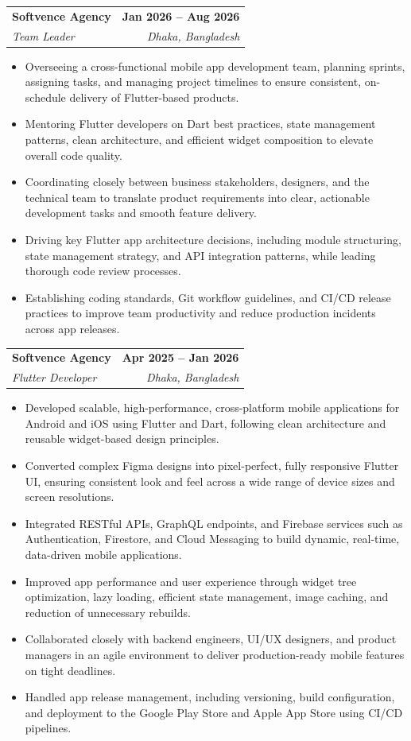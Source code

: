 \documentclass[letterpaper,11pt]{article}
\makeatletter
\newcommand{\resumeItem}[1]{\item\small{{#1 \vspace{-2pt}}}}
\newcommand{\resumeSubheading}[4]{
  \vspace{-2pt}\item
  \begin{tabular*}{1.0\textwidth}[t]{l@{\extracolsep{\fill}}r}
    \textbf{#1} & \textbf{\small #2} \\
    \textit{\small#3} & \textit{\small #4} \\
  \end{tabular*}\vspace{-6pt}
}
\newcommand{\resumeItemListStart}{\begin{itemize}}
\newcommand{\resumeItemListEnd}{\end{itemize}\vspace{-5pt}}
\makeatother
\begin{document}
\resumeSubheading
  {Softvence Agency}{Jan 2026 -- Aug 2026}
  {Team Leader}{Dhaka, Bangladesh}
\resumeItemListStart
\resumeItem{Overseeing a cross-functional mobile app development team, planning sprints, assigning tasks, and managing project timelines to ensure consistent, on-schedule delivery of Flutter-based products.}
\resumeItem{Mentoring Flutter developers on Dart best practices, state management patterns, clean architecture, and efficient widget composition to elevate overall code quality.}
\resumeItem{Coordinating closely between business stakeholders, designers, and the technical team to translate product requirements into clear, actionable development tasks and smooth feature delivery.}
\resumeItem{Driving key Flutter app architecture decisions, including module structuring, state management strategy, and API integration patterns, while leading thorough code review processes.}
\resumeItem{Establishing coding standards, Git workflow guidelines, and CI/CD release practices to improve team productivity and reduce production incidents across app releases.}
\resumeItemListEnd

\resumeSubheading
  {Softvence Agency}{Apr 2025 -- Jan 2026}
  {Flutter Developer}{Dhaka, Bangladesh}
\resumeItemListStart
\resumeItem{Developed scalable, high-performance, cross-platform mobile applications for Android and iOS using Flutter and Dart, following clean architecture and reusable widget-based design principles.}
\resumeItem{Converted complex Figma designs into pixel-perfect, fully responsive Flutter UI, ensuring consistent look and feel across a wide range of device sizes and screen resolutions.}
\resumeItem{Integrated RESTful APIs, GraphQL endpoints, and Firebase services such as Authentication, Firestore, and Cloud Messaging to build dynamic, real-time, data-driven mobile applications.}
\resumeItem{Improved app performance and user experience through widget tree optimization, lazy loading, efficient state management, image caching, and reduction of unnecessary rebuilds.}
\resumeItem{Collaborated closely with backend engineers, UI/UX designers, and product managers in an agile environment to deliver production-ready mobile features on tight deadlines.}
\resumeItem{Handled app release management, including versioning, build configuration, and deployment to the Google Play Store and Apple App Store using CI/CD pipelines.}
\resumeItemListEnd
\end{document}

